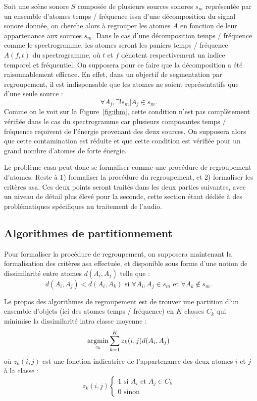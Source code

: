 Soit une scène sonore $S$ composée de plusieurs sources sonores $s_m$ représentée par un ensemble d'atomes temps / fréquence issu d'une décomposition du signal sonore donnée, on cherche alors à regrouper les atomes $A$ en fonction de leur appartenance aux sources $s_m$. Dans le cas d'une décomposition temps / fréquence comme le spectrogramme, les atomes seront les paniers temps / fréquence  $A(f, t)$ du spectrogramme, où $t$ et $f$ dénotent respectivement un indice temporel et fréquentiel. On supposera pour ce faire que la décomposition a été raisonnablement efficace. En effet, dans un objectif de segmentation par regroupement, il est indispensable que les atomes ne soient représentatifs que d'une seule source :
$$\forall A_j, \exists ! s_m | A_j \in s_m\mbox{.}$$
Comme on le voit sur la Figure~\ref{fig:ibm}, cette condition n'est pas complètement vérifiée dans le cas du spectrogramme car plusieurs composantes temps / fréquence reçoivent de l'énergie provenant des deux sources. On supposera alors que cette contamination est réduite et que cette condition est vérifiée pour un grand nombre d'atomes de forte énergie.

Le problème casa peut donc se formaliser comme une procédure de regroupement d'atomes. Reste à 1) formaliser la procédure du regroupement, et 2) formaliser les critères asa. Ces deux points seront traités dans les deux parties suivantes, avec un niveau de détail plus élevé pour la seconde, cette section étant dédiée à des problématiques spécifiques au traitement de l'audio.

\subsection{Algorithmes de partitionnement}

Pour formaliser la procédure de regroupement, on supposera maintenant la formalisation des critères asa effectuée, et disponible sous forme d'une notion de dissimilarité entre atomes $d(A_i, A_j)$ telle que : $$d(A_i, A_j) < d(A_i, A_k) \text{ si } \forall A_i, A_j \in s_m \text{ et } \forall A_k \notin s_m.$$


Le propos des algorithmes de regroupement est de trouver une partition d'un ensemble d'objets (ici des atomes temps / fréquence) en $K$ classes $C_k$ qui minimise la dissimilarité intra classe moyenne :
\begin{equation}
  \operatorname*{argmin}_{z_k} \sum_{k=1}^{K} z_k(i, j) d(A_i, A_j)
\end{equation}
où $z_k(i, j)$ est une fonction indicatrice de l'appartenance des deux atomes $i$ et $j$ à la classe :
\begin{equation}
  z_k(i, j)
  \begin{cases}
    1 \text{ si } A_i \text{ et } A_j \in C_k \\
    0 \text{ sinon}
  \end{cases}
\end{equation}

